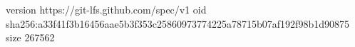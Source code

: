 version https://git-lfs.github.com/spec/v1
oid sha256:a33f41f3b16456aae5b3f353c25860973774225a78715b07af192f98b1d90875
size 267562
